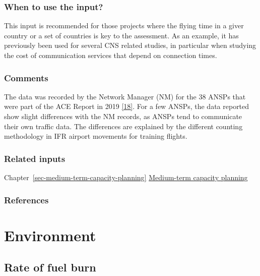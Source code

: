 \documentclass[
  11pt,
  a4paper,
]{book}
\begin{document}
\hypertarget{when-to-use-the-input-2}{%
\section{When to use the input?}\label{when-to-use-the-input-2}}

This input is recommended for those projects where the flying time in a
giver country or a set of countries is key to the assessment. As an
example, it has previously been used for several CNS related studies, in
particular when studying the cost of communication services that depend
on connection times.

\hypertarget{comments-1}{%
\section{Comments}\label{comments-1}}

The data was recorded by the Network Manager (NM) for the 38 ANSPs that
were part of the ACE Report in 2019
\protect\hyperlink{ref-ace2019}{{[}18{]}}. For a few ANSPs, the data
reported show slight differences with the NM records, as ANSPs tend to
communicate their own traffic data. The differences are explained by the
different counting methodology in IFR airport movements for training
flights.

\hypertarget{related-inputs-4}{%
\section{Related inputs}\label{related-inputs-4}}

Chapter~\ref{sec-medium-term-capacity-planning}
\protect\hyperlink{sec-medium-term-capacity-planning}{Medium-term
capacity planning}

\hypertarget{references-5}{%
\section{References}\label{references-5}}

\part{Environment}

\hypertarget{sec-rate-of-fuel-burn}{%
\chapter{Rate of fuel burn}\label{sec-rate-of-fuel-burn}}
\end{document}

